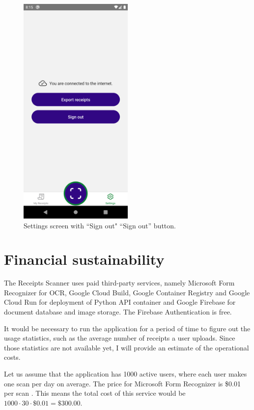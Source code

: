 \documentclass[
  digital, %
  table,   %
  oneside, %
  lof,     %
  lot,     %
]{fithesis3}
\begin{document}
\begin{figure}
    \begin{center}
        \includegraphics[width=0.5\textwidth]{figures/screens/android/light/settings_screen}
    \end{center}
    \caption{Settings screen with ``Sign out" ``Sign out'' button.}
    \label{fig:settings_screen}
\end{figure}

\chapter{Financial sustainability}
The Receipts Scanner uses paid third-party services, namely Microsoft Form Recognizer for OCR, Google Cloud Build, Google Container Registry and Google Cloud Run for deployment of Python API container and Google Firebase for document database and image storage. The Firebase Authentication is free.

It would be necessary to run the application for a period of time to figure out the usage statistics, such as the average number of receipts a user uploads. Since those statistics are not available yet, I will provide an estimate of the operational costs.

Let us assume that the application has \num{1000} active users, where each user makes one scan per day on average.
The price for Microsoft Form Recognizer is \$0.01 per scan \cite{FormRecognizerPricing}. This means the total cost of this service would be $\num{1000}\cdot30\cdot\$0.01 = \$300.00$.
\end{document}

